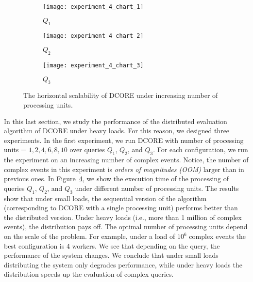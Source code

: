 \begin{figure}[t]
     \begin{adjustbox}{max width=1.5\linewidth,center}
     \centering
     \begin{subfigure}[b]{0.45\textwidth}
         \centering
         \texttt{[image: experiment\_4\_chart\_1]}
         \caption{$Q_{1}$}
         \label{fig:experiment:4:subfigure:1}
     \end{subfigure}
     \begin{subfigure}[b]{0.45\textwidth}
         \centering
         \texttt{[image: experiment\_4\_chart\_2]}
         \caption{$Q_{2}$}
         \label{fig:experiment:4:subfigure:2}
     \end{subfigure}
     \begin{subfigure}[b]{0.45\textwidth}
         \centering
         \texttt{[image: experiment\_4\_chart\_3]}
         \caption{$Q_{3}$}
         \label{fig:experiment:4:subfigure:3}
     \end{subfigure}
     \end{adjustbox}
     \caption{The horizontal scalability of DCORE under increasing number of processing units.}
     \label{fig:experiment:4}
\end{figure}

In this last section, we study the performance of the distributed evaluation algorithm of DCORE under heavy loads. For this reason, we designed three experiments. In the first experiment, we run DCORE with number of processing units = $1, 2, 4, 6, 8, 10$ over queries $Q_{1}$, $Q_{2}$, and $Q_{3}$. For each configuration, we run the experiment on an increasing number of complex events. Notice, the number of complex events in this experiment is \emph{orders of magnitudes (OOM)} larger than in previous ones. In Figure~\ref{fig:experiment:4}, we show the execution time of the processing of queries $Q_{1}$, $Q_{2}$, and $Q_{3}$ under different number of processing units. The results show that under small loads, the sequential version of the algorithm (corresponding to DCORE with a single processing unit) performs better than the distributed version. Under heavy loads (i.e., more than 1 million of complex events), the distribution pays off. The optimal number of processing units depend on the scale of the problem. For example, under a load of $10^{6}$ complex events the best configuration is 4 workers. We see that depending on the query, the performance of the system changes. We conclude that under small loads distributing the system only degrades performance, while under heavy loads the distribution speeds up the evaluation of complex queries.

